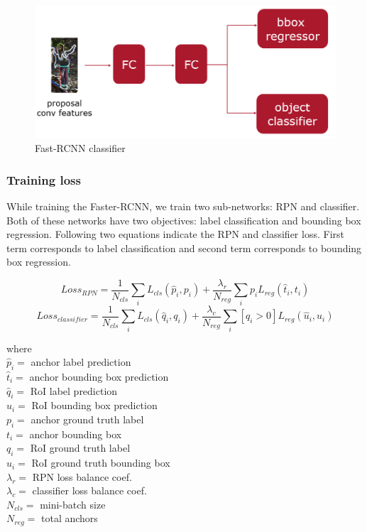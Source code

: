 \begin{figure}
    \centering
    \includegraphics[width=\linewidth]{images/classifier.PNG}
    \caption{Fast-RCNN classifier}
    \label{fig:classifier}
\end{figure}


\subsubsection{Training loss}
While training the Faster-RCNN, we train two sub-networks: RPN and classifier. Both of these networks have two objectives: label classification and bounding box regression. Following two equations indicate the RPN and classifier loss. First term corresponds to label classification and second term corresponds to bounding box regression. 

$$Loss_{RPN}= \frac{1}{N_{cls}}\sum_i L_{cls}(\hat{p}_i,p_i) + \frac{\lambda_r}{N_{reg}}\sum_i p_i L_{reg}(\hat{t}_i,t_i)$$
$$Loss_{classifier} = \frac{1}{N_{cls}}\sum_i L_{cls}(\hat{q}_i,q_i) + \frac{\lambda_c}{N_{reg}}\sum_i [q_i > 0] L_{reg}(\hat{u}_i,u_i)$$

where \\
$\hat{p}_i=$ anchor label prediction \\
$\hat{t}_i=$ anchor bounding box prediction \\
$\hat{q}_i=$ RoI label prediction \\
$\hat{u}_i=$ RoI bounding box prediction \\
${p}_i=$ anchor ground truth label \\
${t}_i=$ anchor bounding box  \\
${q}_i=$ RoI ground truth label  \\
${u}_i=$ RoI ground truth bounding box  \\
$\lambda_r =$ RPN loss balance coef. \\
$\lambda_c =$ classifier loss balance coef. \\
$N_{cls}=$ mini-batch size \\
$N_{reg}=$ total anchors

